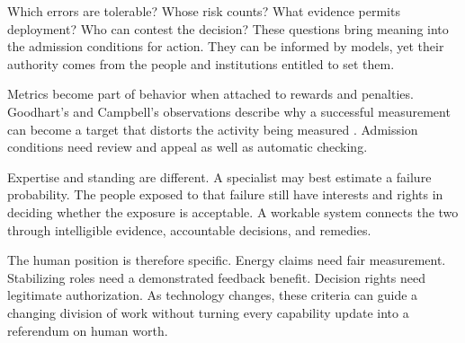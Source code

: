 Which errors are tolerable? Whose risk counts? What evidence permits deployment? Who can contest the decision? These questions bring meaning into the admission conditions for action. They can be informed by models, yet their authority comes from the people and institutions entitled to set them.

Metrics become part of behavior when attached to rewards and penalties. Goodhart's and Campbell's observations describe why a successful measurement can become a target that distorts the activity being measured \cite{goodhart1975problems,campbell1979assessing}. Admission conditions need review and appeal as well as automatic checking.

Expertise and standing are different. A specialist may best estimate a failure probability. The people exposed to that failure still have interests and rights in deciding whether the exposure is acceptable. A workable system connects the two through intelligible evidence, accountable decisions, and remedies.

The human position is therefore specific. Energy claims need fair measurement. Stabilizing roles need a demonstrated feedback benefit. Decision rights need legitimate authorization. As technology changes, these criteria can guide a changing division of work without turning every capability update into a referendum on human worth.

